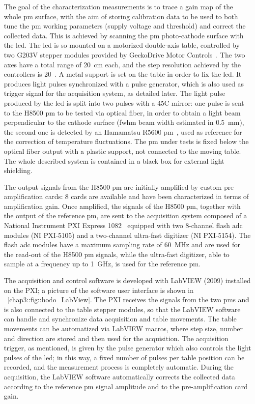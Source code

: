 The goal of the characterization measurements is to trace a gain map of the whole \gls{pm} surface, with the aim of storing calibration data to be used to both tune the \gls{pm} working parameters (supply voltage and threshold) and correct the collected data. This is achieved by scanning the \gls{pm} photo-cathode surface with the \gls{led}. The \gls{led} is so mounted on a motorized double-axis table, controlled by two G203V stepper modules provided by GeckoDrive Motor Controls~\parencite{GeckoDrive2010}. The two axes have a total range of 20~cm each, and the step resolution achieved by the controllers is 20~\charmum. A metal support is set on the table in order to fix the \gls{led}. It produces light pulses synchronized with a pulse generator, which is also used as trigger signal for the acquisition system, as detailed later. The light pulse produced by the \gls{led} is split into two pulses with a 45\textdegree{}C mirror: one pulse is sent to the H8500 \gls{pm} to be tested via optical fiber, in order to obtain a light beam perpendicular to the cathode surface (\gls{fwhm} beam width estimated in 0.5~mm), the second one is detected by an Hamamatsu R5600 \gls{pm}~\parencite{Hamamatsu1995}, used as reference for the correction of temperature fluctuations. The \gls{pm} under tests is fixed below the optical fiber output with a plastic support, not connected to the moving table. The whole described system is contained in a black box for external light shielding.

The output signals from the H8500 \gls{pm} are initially amplified by custom pre-amplification cards: 8 cards are available and have been characterized in terms of amplification gain. Once amplified, the signals of the H8500 \gls{pm}, together with the output of the reference \gls{pm}, are sent to the acquisition system composed of a National Instrument PXI Express 1082~\parencite{NationalInstruments2010} equipped with two 8-channel flash \gls{adc} modules (NI PXI-5105) and a two-channel ultra-fast digitizer (NI PXI-5154). The flash \gls{adc} modules have a maximum sampling rate of 60~MHz and are used for the read-out of the H8500 \gls{pm} signals, while the ultra-fast digitizer, able to sample at a frequency up to 1~GHz, is used for the reference \gls{pm}.

The acquisition and control software is developed with LabVIEW (2009) installed on the PXI; a picture of the software user interface is shown in \figurename~\ref{chap3::fig::hodo_LabView}. The PXI receives the signals from the two \glspl{pm} and is also connected to the table stepper modules, so that the LabVIEW software can handle and synchronize data acquisition and table movements. The table movements can be automatized via LabVIEW macros, where step size, number and direction are stored and then used for the acquisition. The acquisition trigger, as mentioned, is given by the pulse generator which also controls the light pulses of the \gls{led}; in this way, a fixed number of pulses per table position can be recorded, and the measurement process is completely automatic. During the acquisition, the LabVIEW software automatically corrects the collected data according to the reference \gls{pm} signal amplitude and to the pre-amplification card gain.


